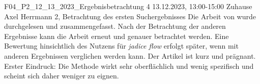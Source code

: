 \fieldnote
{F04\_P2\_12\_13\_2023\_Ergebnisbetrachtung}
{4}
{13.12.2023, 13:00-15:00}
{Zuhause}
{Axel Herrmann}
{2, Betrachtung des ersten Suchergebnisses}
{
	Die Arbeit von  wurde durchgelesen und zusammengefasst.
}
{
	Nach der Betrachtung der anderen Ergebnisse kann die Arbeit erneut und genauer betrachtet werden.
	Eine Bewertung hinsichtlich des Nutzens für \emph{jadice flow} erfolgt später, wenn mit anderen Ergebnissen verglichen werden kann.
}
{
	Der Artikel ist kurz und prägnant.
}
{}
{
	Erster Eindruck: Die Methode wirkt sehr oberflächlich und wenig spezifisch und scheint sich daher weniger zu eignen.
}

